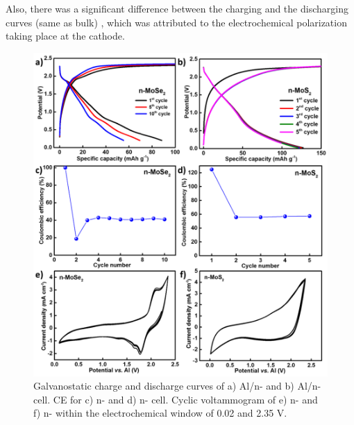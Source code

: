 Also, there was a significant difference between the charging and the discharging curves (same as bulk) , which was attributed to the electrochemical polarization taking place at the cathode.
\begin{figure}[h!]
  \centering
  \includegraphics[width=\textwidth]{Figures/chap4fig/nanocdccecv}
    \caption{Galvanostatic charge and discharge curves of a) Al/n- and b) Al/n- cell. CE for c) n- and d) n- cell. Cyclic voltammogram of e) n- and f) n- within the electrochemical window of 0.02 and 2.35 V.}
  \label{Figures/chap4fig:nanocdccecv}
\end{figure}


